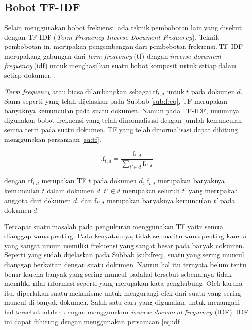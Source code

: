 \subsection{Bobot TF-IDF}
\label{sub:tf-idf}
Selain menggunakan bobot frekuensi, ada teknik pembobotan lain yang disebut dengan TF-IDF (\textit{Term Frequency-Inverse Document Frequency}). Teknik pembobotan ini merupakan pengembangan dari pembobotan frekuensi. TF-IDF merupakang gabungan dari \textit{term frequency} (tf) dengan \textit{inverse document frequency} (idf) untuk menghasilkan suatu bobot komposit untuk setiap \term dalam setiap dokumen \cite{schutze2008introduction}.

\textit{Term frequency} atau biasa dilambangkan sebagai $\textrm{tf}_{t,d}$ untuk \term $t$ pada dokumen $d$. Sama seperti yang telah dijelaskan pada Subbab \ref{sub:freq}, TF merupakan banyaknya kemunculan \term pada suatu dokumen. Namun pada TF-IDF, umumnya digunakan bobot frekuensi yang telah dinormalisasi dengan jumlah kemunculan semua term pada suatu dokumen. TF yang telah dinormalisasi dapat dihitung menggunakan persamaan \ref{eq:tf}.

\begin{equation}
	\label{eq:tf}
	\textrm{tf}_{t,d}=\frac{\textrm{f}_{t,d}}{\sum_{t' \in d}\textrm{f}_{t',d}}
\end{equation}

dengan $\textrm{tf}_{t,d}$ merupakan TF \term $t$ pada dokumen $d$, $\textrm{f}_{t,d}$ merupakan banyaknya kemunculan \term $t$ dalam dokumen $d$, $t' \in d$ merupakan seluruh \term $t'$ yang merupakan anggota dari dokumen $d$, dan $\textrm{f}_{t',d}$ merupakan banyaknya kemunculan \term $t'$ pada dokumen $d$.

Terdapat suatu masalah pada pengukuran menggunakan TF yaitu semua \term dianggap sama penting. Pada kenyatannya, tidak semua \term itu sama penting karena \term yang sangat umum memiliki frekuensi yang sangat besar pada banyak dokumen. Seperti yang sudah dijelaskan pada Subbab \ref{sub:freq}, suatu \term yang sering muncul dianggap berkaitan dengan suatu dokumen. Namun hal itu ternyata belum tentu benar karena banyak \term yang sering muncul padahal \term tersebut sebenarnya tidak memiliki nilai informasi seperti \term yang merupakan kata penghubung. Oleh karena itu, diperlukan suatu mekanisme untuk mengurangi efek dari suatu \term yang sering muncul di banyak dokumen. Salah satu cara yang digunakan untuk menangani hal tersebut adalah dengan menggunakan \textit{inverse document frequency} (IDF). IDF ini dapat dihitung dengan menggunakan persamaan \ref{eq:idf}.

